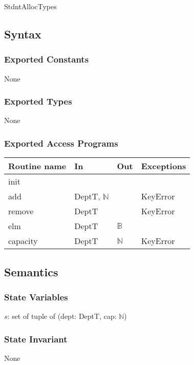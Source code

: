 \documentclass[12pt]{article}
\begin{document}
StdntAllocTypes

\subsection* {Syntax}

\subsubsection* {Exported Constants}

None

\subsubsection* {Exported Types}

None

\subsubsection* {Exported Access Programs}

\begin{tabular}{| l | l | l | p{5cm} |}
\hline
\textbf{Routine name} & \textbf{In} & \textbf{Out} & \textbf{Exceptions}\\
\hline
init & ~ & ~ & ~\\
\hline
add & DeptT, $\mathbb{N}$ & ~ & KeyError\\
\hline
remove & DeptT & ~ & KeyError\\
\hline
elm & DeptT & $\mathbb{B}$ & ~\\
\hline
capacity & DeptT & $\mathbb{N}$ & KeyError\\
\hline
\end{tabular}

\subsection* {Semantics}

\subsubsection* {State Variables}

$s$: set of tuple of (dept: DeptT, cap: $\mathbb{N}$)

\subsubsection* {State Invariant}

None
\end{document}
